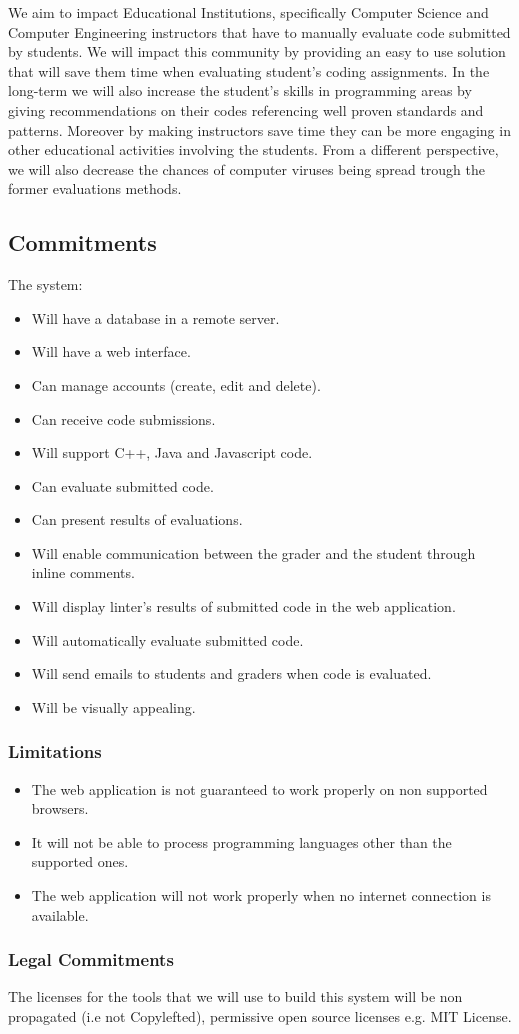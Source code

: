 
We aim to impact Educational Institutions, specifically Computer Science and
Computer Engineering instructors that have to manually evaluate code submitted
by students. We will impact this community by providing an easy to use solution
that will save them time when evaluating student's coding assignments. In the
long-term we will also increase the student's skills in programming areas by
giving recommendations on their codes referencing well proven standards and
patterns. Moreover by making instructors save time they can be more engaging in
other educational activities involving the students. From a different
perspective, we will also decrease the chances of computer viruses being spread
trough the former evaluations methods.

\subsection{Commitments}
The system:
\begin{itemize}
\item Will have a database in a remote server.
\item Will have a web interface.
\item Can manage accounts (create, edit and delete).
\item Can receive code submissions.
\item Will support C++, Java and Javascript code.
\item Can evaluate submitted code.
\item Can present results of evaluations.
\item Will enable communication between the grader and the student through
inline comments.
\item Will display linter's results of submitted code in the web application.
\item Will automatically evaluate submitted code.
\item Will send emails to students and graders when code is evaluated.
\item Will be visually appealing.
\end{itemize}

\subsubsection{Limitations}
\begin{itemize}
\item The web application is not guaranteed to work properly on non supported
browsers.
\item It will not be able to process programming languages other than the
supported ones.
\item The web application will not work properly when no internet connection is
available.
\end{itemize}

\subsubsection{Legal Commitments}

The licenses for the tools that we will use to build this system will be non
propagated (i.e not Copylefted), permissive open source licenses e.g. MIT
License.
